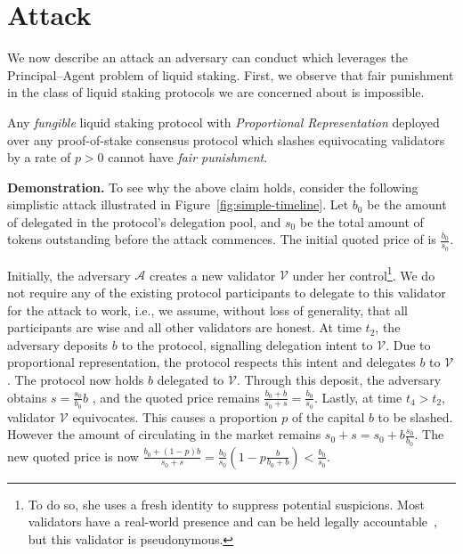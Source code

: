 \section{Attack}\label{sec:attack}

We now describe an attack an adversary can conduct which leverages the
Principal--Agent problem of liquid staking. First, we observe that
fair punishment in the class of liquid staking protocols we are concerned
about is impossible.

\begin{claim}
Any \emph{fungible} liquid staking protocol with \emph{Proportional Representation}
deployed over any proof-of-stake consensus protocol which slashes equivocating validators by a rate of $p > 0$
cannot have \emph{fair punishment}.
\end{claim}

\noindent
\textbf{Demonstration.}
To see why the above claim holds, consider the following simplistic attack
illustrated in Figure~\ref{fig:simple-timeline}.
Let $b_0$ be the amount of delegated \asset in the protocol's delegation pool,
and $s_0$ be the total amount of \stasset tokens outstanding
before the attack commences. The initial quoted price of \stasset
is $\frac{b_0}{s_0}$.

Initially, the adversary $\mathcal{A}$ creates
a new validator $\mathcal{V}$ under her
control\footnote{To do so, she uses a fresh identity
to suppress potential suspicions. Most validators
have a real-world presence and can be held legally
accountable~\cite[p.~29]{liquid-staking-report}, but this validator is pseudonymous.}.
We do not require any of the existing protocol participants to delegate
to this validator for the attack to work, i.e., we assume, without loss of
generality, that all participants
are wise and all other validators are honest.
At time $t_2$, the adversary deposits $b$ \asset to the protocol,
signalling delegation intent to $\mathcal{V}$.
Due to proportional representation,
the protocol respects this intent and delegates $b$ \asset to $\mathcal{V}$.
The protocol now holds $b$ delegated \asset to $\mathcal{V}$.
Through this deposit, the adversary obtains
$s = \frac{s_0}{b_0} b$ \stasset, and the quoted price remains
$\frac{b_0 + b}{s_0 + s} = \frac{b_0}{s_0}$.
Lastly, at time $t_4 > t_2$, validator
$\mathcal{V}$ equivocates. This causes a proportion $p$ of
the capital $b$ to be slashed.
However the amount of \stasset circulating in the
market remains $s_0 + s = s_0 + b\frac{s_0}{b_0}$.
The new quoted price is now
$\frac{b_0 + (1 - p)b}{s_0 + s} = \frac{b_0}{s_0}(1 - p\frac{b}{b_0 + b}) < \frac{b_0}{s_0}$.

